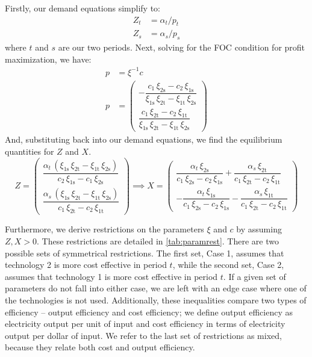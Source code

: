 \documentclass[11pt,a4paper,leqno]{extarticle}
\begin{document}
	Firstly, our demand equations simplify to:
	\begin{align}
	Z_t &= \alpha_t / p_t \\
	Z_s &= \alpha_s / p_s
	\end{align}
	where $t$ and $s$ are our two periods. Next, solving for the FOC condition for profit maximization, we have:
	\begin{align*}
	p &=  \xi^{-1} c \\
	p &= \begin{pmatrix}
	-\dfrac{c_{1}\,\xi _{\mathrm{2s}}-c_{2}\,\xi _{\mathrm{1s}}}{\xi _{\mathrm{1s}}\,\xi _{\mathrm{2t}}-\xi _{\mathrm{1t}}\,\xi _{\mathrm{2s}}}  \\[2ex]
	\dfrac{c_{1}\,\xi _{\mathrm{2t}}-c_{2}\,\xi _{\mathrm{1t}}}{\xi _{\mathrm{1s}}\,\xi _{\mathrm{2t}}-\xi _{\mathrm{1t}}\,\xi _{\mathrm{2s}}} 
	\end{pmatrix} 
	\end{align*}
	And, substituting back into our demand equations, we find the equilibrium quantities for $Z$ and $X$. 
	$$
	Z = \begin{pmatrix}
	\dfrac{\alpha _{t}\,\left(\xi _{\mathrm{1s}}\,\xi _{\mathrm{2t}}-\xi _{\mathrm{1t}}\,\xi _{\mathrm{2s}}\right)}{c_{2}\,\xi _{\mathrm{1s}} - c_{1}\,\xi _{\mathrm{2s}}} \\[2ex]
	\dfrac{\alpha _{s}\,\left(\xi _{\mathrm{1s}}\,\xi _{\mathrm{2t}}-\xi _{\mathrm{1t}}\,\xi _{\mathrm{2s}}\right)}{c_{1}\,\xi _{\mathrm{2t}}-c_{2}\,\xi _{\mathrm{1t}}} 
	\end{pmatrix}
	\implies 
	X = \begin{pmatrix}
	\dfrac{\alpha _{t}\,\xi _{\mathrm{2s}}}{c_{1}\,\xi _{\mathrm{2s}}-c_{2}\,\xi _{\mathrm{1s}}}+\dfrac{\alpha _{s}\,\xi _{\mathrm{2t}}}{c_{1}\,\xi _{\mathrm{2t}}-c_{2}\,\xi _{\mathrm{1t}}} \\[2ex] 
	-\dfrac{\alpha _{t}\,\xi _{\mathrm{1s}}}{c_{1}\,\xi _{\mathrm{2s}}-c_{2}\,\xi _{\mathrm{1s}}}-\dfrac{\alpha _{s}\,\xi _{\mathrm{1t}}}{c_{1}\,\xi _{\mathrm{2t}}-c_{2}\,\xi _{\mathrm{1t}}}
	\end{pmatrix}
	$$
	
	Furthermore, we derive restrictions on the parameters $\xi$ and $c$ by assuming $Z, X > 0$. These restrictions are detailed in \autoref{tab:paramrest}. There are two possible sets of symmetrical restrictions. The first set, Case 1, assumes that technology 2 is more cost effective in period $t$, while the second set, Case 2, assumes that technology 1 is more cost effective in period $t$. If a given set of parameters do not fall into either case, we are left with an edge case where one of the technologies is not used. Additionally, these inequalities compare two types of efficiency -- output efficiency and cost efficiency; we define output efficiency as electricity output per unit of input and cost efficiency in terms of electricity output per dollar of input. We refer to the last set of restrictions as mixed, because they relate both cost and output efficiency. 
\end{document}
